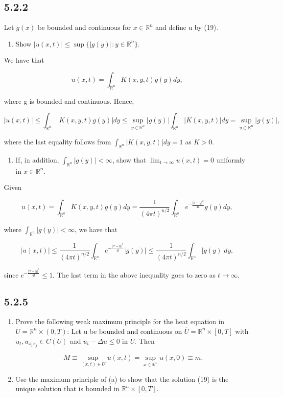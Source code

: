 \documentclass{article}
\begin{document}
\subsection{\textbf{5.2.2}} Let $g(x)$ be bounded and continuous for $x\in\mathbb R^n$ and define u by (19).
\begin{enumerate}[label=(\alph*)]
    \item Show $|u(x,t)|\leq \sup\{|g(y)|:y\in\mathbb R^n\}$.
\end{enumerate}

We have that

$$u(x,t)=\int_{\mathbb R^n}K(x,y,t)g(y)dy,$$

where g is bounded and continuous. Hence,

$$|u(x,t)|\leq \int_{\mathbb R^n}|K(x,y,t)g(y)|dy\leq \sup_{y\in\mathbb R^n}{|g(y)|}\int_{\mathbb R^n}|K(x,y,t)|dy=\sup_{y\in\mathbb R^n}{|g(y)|},$$

where the last equality follows from $\int_{\mathbb R^n}|K(x,y,t)|dy=1$ as $K>0$.
\begin{enumerate}[label=(\alph*),start=2]
    \item If, in addition, $\int_{\mathbb R^n}|g(y)|<\infty$, show that $\lim_{t\to\infty}u(x,t)=0$ uniformly in $x\in\mathbb R^n$.
\end{enumerate}

Given

$$u(x,t)=\int_{\mathbb R^n}K(x,y,t)g(y)dy=\frac{1}{(4\pi t)^{n/2}}\int_{\mathbb R^n}e^{-\frac{|x-y|^2}{4t}}g(y)dy,$$

where $\int_{\mathbb R^n}|g(y)|<\infty$, we have that

$$|u(x,t)|\leq \frac{1}{(4\pi t)^{n/2}}\int_{\mathbb R^n}e^{-\frac{|x-y|^2}{4t}}|g(y)|\leq \frac{1}{(4\pi t)^{n/2}}\int_{\mathbb R^n}|g(y)|dy,$$

since $e^{-\frac{|x-y|^2}{4t}} \leq 1$. The last term in the above inequality goes to zero as $t\to\infty$.

\subsection{\textbf{5.2.5}}

\begin{enumerate}[label=(\alph*)]
    \item Prove the following weak maximum principle for the heat equation in $U=\mathbb R^n\times (0,T)$: Let u be bounded and continuous on $\overline{U}=\mathbb R^n\times [0,T]$ with $u_t,u_{x_ix_j}\in C(U)$ and $u_t-\Delta u \leq 0$ in $U$. Then
    
    $$M\equiv\sup_{(x,t)\in U}u(x,t)=\sup_{x\in\mathbb R^n}u(x,0)\equiv m.$$
    \item Use the maximum principle of (a) to show that the solution (19) is the unique solution that is bounded in $\mathbb R^n\times [0,T]$.
\end{enumerate}
\end{document}

